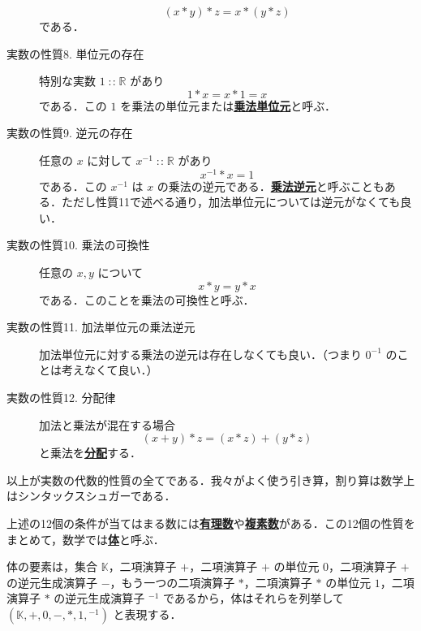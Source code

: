 \documentclass[a4paper,twocolumn]{jsbook}
\newcommand{\keyword}[1]{{\underline{\textbf{#1}}}}
\DeclareMathOperator{\mIn}{{:\!:}}
\newcommand{\mSpecialSet}[1]{\mathbb{#1}} %
\newcommand{\mKSet}{\mSpecialSet{K}}
\newcommand{\mRSet}{\mSpecialSet{R}}
\newcommand{\mTupleWith}[1]{\left(#1\right)}
\begin{document}
\begin{description}
\begin{equation}
(x*y)*z=x*(y*z)
\end{equation}
である．
\item[実数の性質8. 単位元の存在] 特別な実数 $1\mIn\mRSet$ があり
\begin{equation}
1*x=x*1=x
\end{equation}
である．この $1$ を乗法の単位元または\keyword{乗法単位元}と呼ぶ．
\item[実数の性質9. 逆元の存在] 任意の $x$ に対して $x^{-1}\mIn\mRSet$ があり
\begin{equation}
x^{-1}*x=1
\end{equation}
である．この $x^{-1}$ は $x$ の乗法の逆元である．\keyword{乗法逆元}と呼ぶこともある．ただし性質11で述べる通り，加法単位元については逆元がなくても良い．
\item[実数の性質10. 乗法の可換性] 任意の $x,y$ について
\begin{equation}
x*y=y*x
\end{equation}
である．このことを乗法の可換性と呼ぶ．
\item[実数の性質11. 加法単位元の乗法逆元] 加法単位元に対する乗法の逆元は存在しなくても良い．（つまり $0^{-1}$ のことは考えなくて良い．）
\item[実数の性質12. 分配律] 加法と乗法が混在する場合
\begin{equation}
(x+y)*z=(x*z)+(y*z)
\end{equation}
と乗法を\keyword{分配}する．
\end{description}
以上が実数の代数的性質の全てである．我々がよく使う引き算，割り算は数学上はシンタックスシュガーである．

上述の12個の条件が当てはまる数には\keyword{有理数}や\keyword{複素数}がある．この12個の性質をまとめて，数学では\keyword{体}と呼ぶ．

体の要素は，集合 $\mKSet$，二項演算子 $+$，二項演算子 $+$ の単位元 $0$，二項演算子 $+$ の逆元生成演算子 $-$，もう一つの二項演算子 $*$，二項演算子 $*$ の単位元 $1$，二項演算子 $*$ の逆元生成演算子 ${}^{-1}$ であるから，体はそれらを列挙して $\mTupleWith{\mKSet,+,0,-,*,1,{}^{-1}}$ と表現する．
\end{document}

